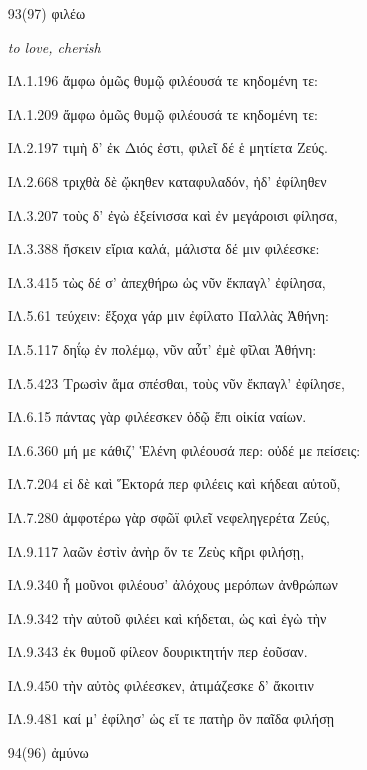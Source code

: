 \begin{enumerate}
{ΙΛ.11.54 αἵματι μυδαλέας ἐξ αἰθέρος, οὕνεκ' ἔμελλε 

ΙΛ.11.181 ἀλλ' ὅτε δὴ τάχ' ἔμελλον ὑπὸ πτόλιν αἰπύ τε τεῖχος 

ΙΛ.11.364 ᾧ μέλλεις εὔχεσθαι ἰὼν ἐς δοῦπον ἀκόντων. 

}

\clearpage
\item[\large 93(97)]{\large \g φιλέω}

\hspace{0.2cm} \textit{ to love, cherish }

{\g
ΙΛ.1.196 ἄμφω ὁμῶς θυμῷ φιλέουσά τε κηδομένη τε: 

ΙΛ.1.209 ἄμφω ὁμῶς θυμῷ φιλέουσά τε κηδομένη τε: 

ΙΛ.2.197 τιμὴ δ' ἐκ Διός ἐστι, φιλεῖ δέ ἑ μητίετα Ζεύς. 

ΙΛ.2.668 τριχθὰ δὲ ᾤκηθεν καταφυλαδόν, ἠδ' ἐφίληθεν 

ΙΛ.3.207 τοὺς δ' ἐγὼ ἐξείνισσα καὶ ἐν μεγάροισι φίλησα, 

ΙΛ.3.388 ἤσκειν εἴρια καλά, μάλιστα δέ μιν φιλέεσκε: 

ΙΛ.3.415 τὼς δέ σ' ἀπεχθήρω ὡς νῦν ἔκπαγλ' ἐφίλησα, 

ΙΛ.5.61 τεύχειν: ἔξοχα γάρ μιν ἐφίλατο Παλλὰς Ἀθήνη: 

ΙΛ.5.117 δηΐῳ ἐν πολέμῳ, νῦν αὖτ' ἐμὲ φῖλαι Ἀθήνη: 

ΙΛ.5.423 Τρωσὶν ἅμα σπέσθαι, τοὺς νῦν ἔκπαγλ' ἐφίλησε, 

ΙΛ.6.15 πάντας γὰρ φιλέεσκεν ὁδῷ ἔπι οἰκία ναίων. 

ΙΛ.6.360 μή με κάθιζ' Ἑλένη φιλέουσά περ: οὐδέ με πείσεις: 

ΙΛ.7.204 εἰ δὲ καὶ Ἕκτορά περ φιλέεις καὶ κήδεαι αὐτοῦ, 

ΙΛ.7.280 ἀμφοτέρω γὰρ σφῶϊ φιλεῖ νεφεληγερέτα Ζεύς, 

ΙΛ.9.117 λαῶν ἐστὶν ἀνὴρ ὅν τε Ζεὺς κῆρι φιλήσῃ, 

ΙΛ.9.340 ἦ μοῦνοι φιλέουσ' ἀλόχους μερόπων ἀνθρώπων 

ΙΛ.9.342 τὴν αὐτοῦ φιλέει καὶ κήδεται, ὡς καὶ ἐγὼ τὴν 

ΙΛ.9.343 ἐκ θυμοῦ φίλεον δουρικτητήν περ ἐοῦσαν. 

ΙΛ.9.450 τὴν αὐτὸς φιλέεσκεν, ἀτιμάζεσκε δ' ἄκοιτιν 

ΙΛ.9.481 καί μ' ἐφίλησ' ὡς εἴ τε πατὴρ ὃν παῖδα φιλήσῃ 

}

\clearpage
\item[\large 94(96)]{\large \g ἀμύνω}


\end{enumerate}
